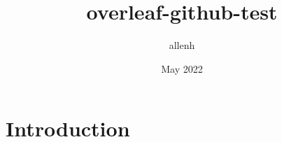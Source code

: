 \documentclass{article}
\title{overleaf-github-test}
\author{allenh }
\date{May 2022}
\begin{document}
\maketitle

\section{Introduction}
\end{document}
